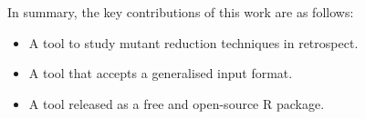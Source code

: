     In summary, the key contributions of this work are as follows:
    \begin{itemize}
        \item A tool to study mutant reduction techniques in retrospect.
        \item A tool that accepts a generalised input format.
        \item A tool released as a free and open-source R package.
    \end{itemize}

